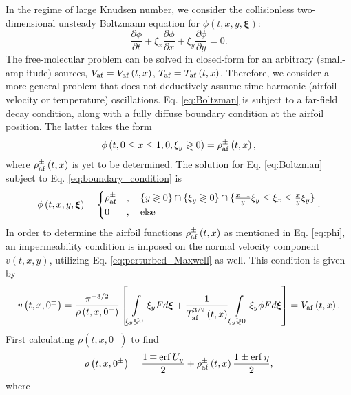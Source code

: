 In the regime of large Knudsen number, we consider the collisionless two-dimensional unsteady Boltzmann equation for $\phi\left(t,x,y,\boldsymbol{\xi}\right)$:
\begin{equation} \label{eq:Boltzman}
    \frac{\partial\phi}{\partial t}
    +
    \xi_x\frac{\partial\phi}{\partial x}
    +
    \xi_y\frac{\partial\phi}{\partial y}
    =
    0
    .
\end{equation}
The free-molecular problem can be solved in closed-form for an arbitrary (small-amplitude) sources, $V_{\mathrm{af}}=V_{\mathrm{af}}\left(t,x\right)$, $T_{\mathrm{af}}=T_{\mathrm{af}}\left(t,x\right)$. Therefore, we consider a more general problem that does not deductively assume time-harmonic (airfoil velocity or temperature) oscillations. Eq. \ref{eq:Boltzman} is subject to a far-field decay condition, along with a fully diffuse boundary condition at the airfoil position. The latter takes the form
\begin{equation} \label{eq:boundary_condition}
    \phi\left(t,0\leq x\leq 1,0,\xi_y \gtrless 0 \right)
    =
    \rho_{\mathrm{af}}^\pm\left(t,x\right)
    ,
\end{equation}
where $\rho_{\mathrm{af}}^\pm\left(t,x\right)$ is yet to be determined. The solution for Eq. \ref{eq:Boltzman} subject to Eq. \ref{eq:boundary_condition} is
\begin{equation} \label{eq:phi}
    \phi\left(t,x,y,\boldsymbol{\xi}\right)
    =
    \begin{cases}
        \rho_{\mathrm{af}}^\pm & ,\quad\{ y \gtrless 0 \} \cap \{ \xi_y \gtrless 0 \} \cap \{ \frac{x-1}{y}\xi_y \leq \xi_x \leq \frac{x}{y}\xi_y \} \\        
        0            & ,\quad\text{else}

    \end{cases}
    .
\end{equation}
In order to determine the airfoil functions $\rho_{\mathrm{af}}^\pm\left(t,x\right)$  as mentioned in Eq. \ref{eq:phi}, an impermeability condition is imposed on the normal velocity component $v\left(t,x,y\right)$, utilizing Eq. \ref{eq:perturbed_Maxwell} as well. This condition is given by
\begin{equation} \label{eq:impermeability}
    v\left(t,x,0^\pm\right)
    =
    \frac{\pi^{-3/2}}{\rho\left(t,x,0^\pm\right)} \left[ \int\limits_{\xi_y\lessgtr0}\xi_y F d\boldsymbol{\xi}  
    +
    \frac{1}{T_{\mathrm{af}}^{3/2}\left(t,x\right)}
    \int\limits_{\xi_y\gtrless0}\xi_y\phi F d\boldsymbol{\xi}    
    \right]
    =
    V_{\mathrm{af}}\left(t,x\right)
    .
\end{equation}
First calculating $\rho\left(t,x,0^\pm\right)$ to find
\begin{equation} \label{eq:rho_0}
    \rho\left(t,x,0^\pm\right)
    =
    \frac{1\mp\operatorname{erf} U_y}{2}
    +
    \rho_{\mathrm{af}}^\pm\left(t,x\right)\frac{1\pm\operatorname{erf}\eta}{2}
    ,
\end{equation}
where

